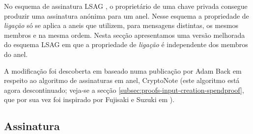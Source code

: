 \begin{description}

No esquema de assinatura LSAG \cite{Liu2004}, o proprietário de uma chave privada consegue produzir uma assinatura anónima para um anel. Nesse esquema a propriedade de {\em ligação} só se aplica a aneis que utilizem, para mensagens distintas, os mesmos membros e na mesma ordem. Nesta secção apresentamos uma versão melhorada do esquema LSAG em que a propriedade de {\em ligação} é independente dos membros do anel.

A modificação foi descoberta em \cite{MRL-0005-ringct} baseado numa publicação por Adam Back \cite{AdamBack-ring-efficiency} em respeito ao algoritmo de assinaturas em anel, CryptoNote \cite{cryptoNoteWhitePaper} (este algoritmo está agora descontinuado; veja-se a secção \ref{subsec:proofs-input-creation-spendproof}, que por sua vez foi inspirado por Fujisaki e Suzuki em \cite{Fujisaki2007}). 
\subsection*{Assinatura}


\end{description}
